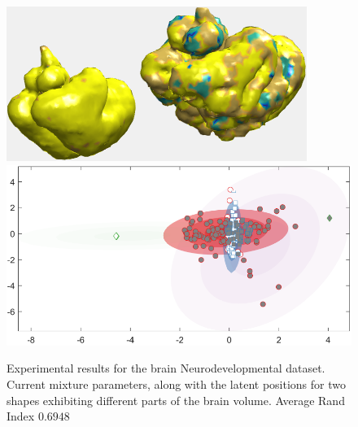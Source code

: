 \documentclass[]{article}
\begin{document}
\begin{figure}[ht!]
	\centering
	
	\includegraphics[width=0.45\linewidth]{img/brainBaby}
	\includegraphics[width=0.45\linewidth]{img/babyMVMMexp3}
	\caption{Experimental results for the brain Neurodevelopmental dataset.  Current mixture parameters, along with the latent positions for two shapes exhibiting different parts of the brain volume. Average Rand Index $0.6948$ }
	\label{fig:brainBaby}
\end{figure}
\end{document}
